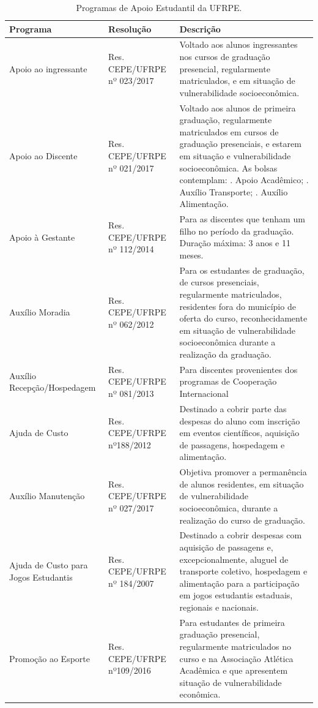 \documentclass[
	12pt,				%
	openright,			%
  oneside,     %
	a4paper,			%
	chapter=TITLE,		%
	english,			%
	french,				%
	spanish,			%
	brazil				%
	]{abntex2}
\begin{document}
\begin{center}
  
  \begin{scriptsize}
    \begin{longtable}{p{3.2cm}p{3cm}p{8cm}}
      \caption{\label{quadro:programas-apoio-estudantil-ufrpe}Programas de Apoio Estudantil da UFRPE.} \\
      \toprule
      \textbf{Programa} & \textbf{Resolução} & \textbf{Descrição}\\ \midrule
      Apoio ao ingressante & Res. CEPE/UFRPE nº 023/2017 & Voltado aos alunos ingressantes nos cursos de graduação presencial, regularmente matriculados, e em situação de vulnerabilidade socioeconômica.\\ \midrule
      Apoio ao Discente & Res. CEPE/UFRPE nº 021/2017 & Voltado aos alunos de primeira graduação, regularmente matriculados em cursos de graduação presenciais, e estarem em situação e vulnerabilidade socioeconômica. As bolsas contemplam: \newline
      1. Apoio Acadêmico; \newline
      2. Auxílio Transporte; \newline
      3. Auxílio Alimentação. \\ \midrule
      Apoio à Gestante & Res. CEPE/UFRPE nº 112/2014 & Para as discentes que tenham um filho no período da graduação. Duração máxima: 3 anos e 11 meses. \\ \midrule
      Auxílio Moradia & Res. CEPE/UFRPE nº 062/2012 & Para os estudantes de graduação, de cursos presenciais, regularmente matriculados, residentes fora do município de oferta do curso, reconhecidamente em situação de vulnerabilidade socioeconômica durante a realização da graduação. \\ \midrule
      Auxílio \newline Recepção/Hospedagem & Res. CEPE/UFRPE nº 081/2013 & Para discentes provenientes dos programas de Cooperação Internacional \\ \midrule
      Ajuda de Custo & Res. CEPE/UFRPE nº188/2012 & Destinado a cobrir parte das despesas do aluno com inscrição em eventos científicos, aquisição de passagens, hospedagem e alimentação. \\ \midrule
      Auxílio Manutenção & Res. CEPE/UFRPE nº 027/2017 & Objetiva promover a permanência de alunos residentes, em situação de vulnerabilidade socioeconômica, durante a realização do curso de graduação. \\ \midrule
      Ajuda de Custo para Jogos Estudantis & Res. CEPE/UFRPE nº 184/2007 & Destinado a cobrir despesas com aquisição de passagens e, excepcionalmente, aluguel de transporte coletivo, hospedagem e alimentação para a participação em jogos estudantis estaduais, regionais e nacionais.\\ \midrule
      Promoção ao Esporte & Res. CEPE/UFRPE nº109/2016 & Para estudantes de primeira graduação presencial, regularmente matriculados no curso e na Associação Atlética Acadêmica e que apresentem situação de vulnerabilidade econômica.\\
    \bottomrule
\end{longtable}
\end{scriptsize}
\end{center}
\end{document}
